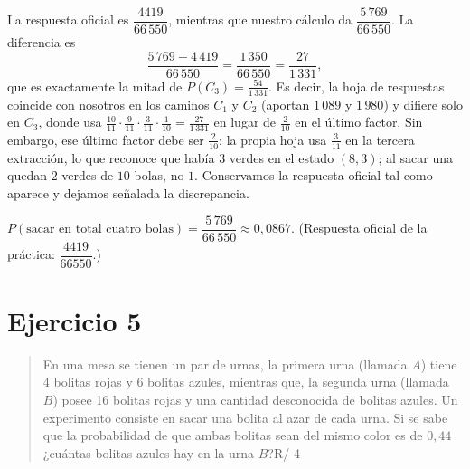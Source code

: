 \documentclass[11pt]{article}
\begin{document}
\begin{nota}
La respuesta oficial es $\dfrac{4419}{66\,550}$, mientras que nuestro cálculo da $\dfrac{5\,769}{66\,550}$. La diferencia es
\[
\frac{5\,769-4\,419}{66\,550}=\frac{1\,350}{66\,550}=\frac{27}{1\,331},
\]
que es exactamente la mitad de $P(C_3)=\tfrac{54}{1\,331}$. Es decir, la hoja de respuestas coincide con nosotros en los caminos $C_1$ y $C_2$ (aportan $1\,089$ y $1\,980$) y difiere solo en $C_3$, donde usa $\tfrac{10}{11}\cdot\tfrac{9}{11}\cdot\tfrac{3}{11}\cdot\tfrac{1}{10}=\tfrac{27}{1\,331}$ en lugar de $\tfrac{2}{10}$ en el último factor. Sin embargo, ese último factor debe ser $\tfrac{2}{10}$: la propia hoja usa $\tfrac{3}{11}$ en la tercera extracción, lo que reconoce que había $3$ verdes en el estado $(8,3)$; al sacar una quedan $2$ verdes de $10$ bolas, no $1$. Conservamos la respuesta oficial tal como aparece y dejamos señalada la discrepancia.
\end{nota}

\begin{resp}
$P(\text{sacar en total cuatro bolas})=\dfrac{5\,769}{66\,550}\approx 0{,}0867$. \quad (Respuesta oficial de la práctica: $\dfrac{4419}{66550}$.)
\end{resp}

\section*{Ejercicio 5}

\begin{quote}
En una mesa se tienen un par de urnas, la primera urna (llamada $A$) tiene 4 bolitas rojas y 6 bolitas azules, mientras que, la segunda urna (llamada $B$) posee 16 bolitas rojas y una cantidad desconocida de bolitas azules. Un experimento consiste en sacar una bolita al azar de cada urna. Si se sabe que la probabilidad de que ambas bolitas sean del mismo color es de $0{,}44$ ¿cuántas bolitas azules hay en la urna $B$?\hfill R/ 4
\end{quote}
\end{document}
